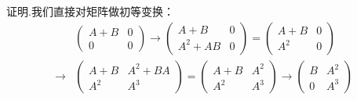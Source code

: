 \documentclass{article}
\begin{document}
\setcounter{page}{87}                           %
{\heiti 证明.}我们直接对矩阵做初等变换：
\begin{equation*}                               %
    \begin{split}                               %
        &\left(                                 %
        \begin{array}{cc}                       %
            A + B & 0 \\                        %
            0     & 0                           %
        \end{array}
        \right)
        \longrightarrow                         %
        \left(
        \begin{array}{cc}
            A + B    & 0 \\
            A^2 + AB & 0
        \end{array}
        \right)
        =
        \left(
        \begin{array}{cc}
            A + B & 0 \\
            A^2   & 0
        \end{array}
        \right) \\
        \longrightarrow
        &\left(
        \begin{array}{cc}
            A + B & A^2 + BA \\
            A^2   & A^3
        \end{array}
        \right)
        =
        \left(
            \begin{array}{cc}
                A + B & A^2 \\
                A^2 & A^3
            \end{array}
        \right)
        \longrightarrow
        \left(
            \begin{array}{cc}
                B & A^2 \\
                0 & A^3
            \end{array}
        \right)
    \end{split}
\end{equation*}
\end{document}
